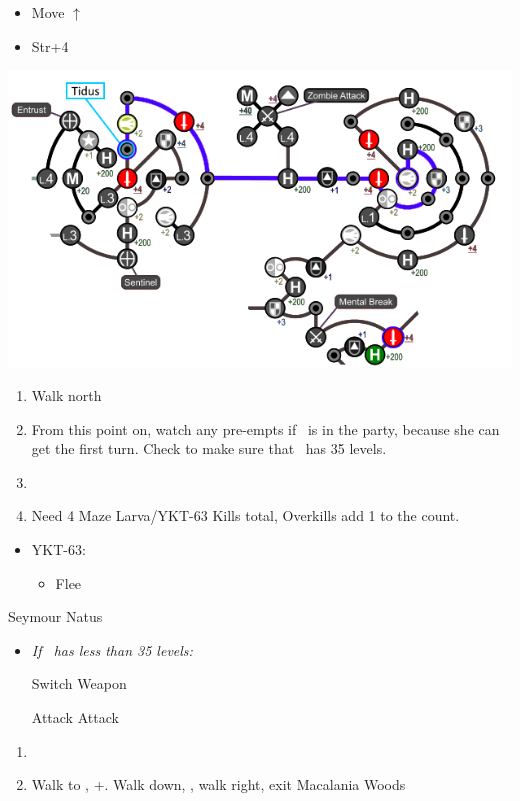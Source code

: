 \begin{spheregrid}
\begin{itemize}
\begin{itemize}
            \item Move $\uparrow$
            \item Str+4
          \end{itemize}
          \includegraphics[width=.9\columnwidth]{graphics/Yuna_blitz_loss_1}
  \end{itemize}
\end{spheregrid}
\begin{enumerate}
  \item Walk north
  \item From this point on, watch any pre-empts if \yuna\ is in the party, because she can get the first turn. Check to make sure that \lulu\ has 35 levels.
  \item \formation{\tidus}{\yuna}{\auron}
  \item Need 4 Maze Larva/YKT-63 Kills total, Overkills add 1 to the count.
\end{enumerate}
\begin{encounters}
  \begin{itemize}
    \item YKT-63:
          \begin{itemize}
            \tidusf Attack
            \yunaf Attack
            \item Flee
          \end{itemize}
  \end{itemize}
\end{encounters}
\begin{battle}[36000]{Seymour Natus}
  \begin{itemize}
    \item \textit{If \lulu\ has less than 35 levels:}
          \begin{itemize}
            \switch{\tidus}{\lulu}
            \luluf Switch Weapon
            \switch{\lulu}{\tidus}
          \end{itemize}
          \tidusf Attack
          \summon{\bahamut}
          \bahamutf Attack
  \end{itemize}
\end{battle}
\begin{enumerate}[resume]
  \item \sd
  \item Walk to \yuna, \cs+\skippablefmv[10:10]. Walk down, \cs[1:40], walk right, exit Macalania Woods
\end{enumerate}